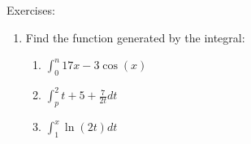 \documentclass[../revisedmain.tex]{subfiles}
\begin{document}
	\begin{center}
		\LARGE Exercises:
	\end{center}
	\begin{enumerate}
		\item Find the function generated by the integral:
		\begin{enumerate}
			\item $\int_{0}^{n}17x-3\cos(x)$
			\item $\int_{p}^{2}t+5+\frac{7}{2t}dt$
			\item $\int_{1}^{x}\ln(2t)dt$
		\end{enumerate}
	\end{enumerate}
\end{document}
